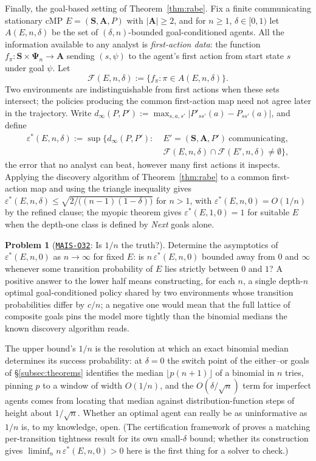 \documentclass[11pt]{amsart}
\newcommand{\Oid}[1]{\href{https://github.com/lionellevine/MAIS/blob/main/open-problems/MAIS-O#1.md}{\texttt{MAIS-O#1}}}
\theoremstyle{plain}
\theoremstyle{definition}
\newtheorem{problem}[theorem]{Problem}
\newcommand{\bS}{\mathbf{S}}
\newcommand{\bA}{\mathbf{A}}
\newcommand{\bPsi}{\boldsymbol{\Psi}}
\begin{document}
Finally, the goal-based setting of Theorem~\ref{thm:rabe}. Fix a finite communicating stationary cMP $E=(\bS,\bA,P)$ with $|\bA|\ge2$, and for $n\ge1$, $\delta\in[0,1)$ let $A(E,n,\delta)$ be the set of $(\delta,n)$-bounded goal-conditioned agents. All the information available to any analyst is \emph{first-action data}: the function $f_\pi\colon \bS\times\bPsi_n\to\bA$ sending $(s,\psi)$ to the agent's first action from start state $s$ under goal $\psi$. Let
\[
   \mathcal F(E,n,\delta):=\{f_\pi:\pi\in A(E,n,\delta)\}.
\]
Two environments are indistinguishable from first actions when these sets intersect; the policies producing the common first-action map need not agree later in the trajectory. Write \(d_\infty(P,P'):=\max_{s,a,s'}|P'_{ss'}(a)-P_{ss'}(a)|\), and define
\[
 \begin{aligned}
   \varepsilon^*(E,n,\delta):=\sup\bigl\{d_\infty(P,P'):\;&E'=(\bS,\bA,P')\ \text{communicating},\\
   &\mathcal F(E,n,\delta)\cap\mathcal F(E',n,\delta)\neq\emptyset\bigr\},
 \end{aligned}
\]
the error that no analyst can beat, however many first actions it inspects. Applying the discovery algorithm of Theorem~\ref{thm:rabe} to a common first-action map and using the triangle inequality gives $\varepsilon^*(E,n,\delta)\le\sqrt{2/\bigl((n-1)(1-\delta)\bigr)}$ for $n>1$, with $\varepsilon^*(E,n,0)=O(1/n)$ by the refined clause; the myopic theorem gives $\varepsilon^*(E,1,0)=1$ for suitable $E$ when the depth-one class is defined by \emph{Next} goals alone.

\begin{problem}[\Oid{32}: Is $1/n$ the truth?]\label{prob:rate}
Determine the asymptotics of $\varepsilon^*(E,n,0)$ as $n\to\infty$ for fixed $E$: is $n\,\varepsilon^*(E,n,0)$ bounded away from $0$ and $\infty$ whenever some transition probability of $E$ lies strictly between $0$ and $1$? A positive answer to the lower half means constructing, for each $n$, a single depth-$n$ optimal goal-conditioned policy shared by two environments whose transition probabilities differ by $c/n$; a negative one would mean that the full lattice of composite goals pins the model more tightly than the binomial medians the known discovery algorithm reads.
\end{problem}

The upper bound's $1/n$ is the resolution at which an exact binomial median determines its success probability: at $\delta=0$ the switch point of the either--or goals of \S\ref{subsec:theorems} identifies the median $\lfloor p(n+1)\rfloor$ of a binomial in $n$ tries, pinning $p$ to a window of width $O(1/n)$, and the $O(\delta/\sqrt{n})$ term for imperfect agents comes from locating that median against distribution-function steps of height about $1/\sqrt{n}$. Whether an optimal agent can really be as uninformative as $1/n$ is, to my knowledge, open. (The certification framework of \cite{lu2026} proves a matching per-transition tightness result for its own small-$\delta$ bound; whether its construction gives $\liminf_n n\,\varepsilon^*(E,n,0)>0$ here is the first thing for a solver to check.)
\end{document}
